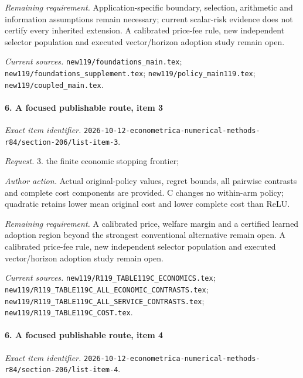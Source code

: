 \par\emph{Remaining requirement.} Application-specific boundary, selection, arithmetic and information assumptions remain necessary; current scalar-risk evidence does not certify every inherited extension. A calibrated price-fee rule, new independent selector population and executed vector/\allowbreak{}horizon adoption study remain open.

\par\emph{Current sources.} \nolinkurl{new119/foundations_main.tex}; \nolinkurl{new119/foundations_supplement.tex}; \nolinkurl{new119/policy_main119.tex}; \nolinkurl{new119/coupled_main.tex}.

\paragraph{6. A focused publishable route, item 3}

\emph{Exact item identifier.} \nolinkurl{2026-10-12-econometrica-numerical-methods-r84/section-206/list-item-3}.

\par\emph{Request.} 3. the finite economic stopping frontier;

\par\emph{Author action.} Actual original-policy values, regret bounds, all pairwise contrasts and complete cost components are provided. C changes no within-arm policy; quadratic retains lower mean original cost and lower complete cost than ReLU.

\par\emph{Remaining requirement.} A calibrated price, welfare margin and a certified learned adoption region beyond the strongest conventional alternative remain open. A calibrated price-fee rule, new independent selector population and executed vector/\allowbreak{}horizon adoption study remain open.

\par\emph{Current sources.} \nolinkurl{new119/R119_TABLE119C_ECONOMICS.tex}; \nolinkurl{new119/R119_TABLE119C_ALL_ECONOMIC_CONTRASTS.tex}; \nolinkurl{new119/R119_TABLE119C_ALL_SERVICE_CONTRASTS.tex}; \nolinkurl{new119/R119_TABLE119C_COST.tex}.

\paragraph{6. A focused publishable route, item 4}

\emph{Exact item identifier.} \nolinkurl{2026-10-12-econometrica-numerical-methods-r84/section-206/list-item-4}.

